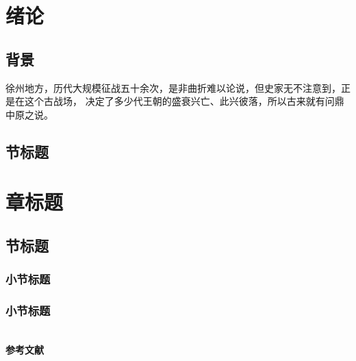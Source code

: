 
\section{绪论}

\subsection{背景}

\par 徐州地方，历代大规模征战五十余次，是非曲折难以论说，但史家无不注意到，正是在这个古战场，
决定了多少代王朝的盛衰兴亡、此兴彼落，所以古来就有问鼎中原之说。

\subsection{节标题}

\section{章标题}

\subsection{节标题}

\subsubsection{小节标题}

\subsubsection{小节标题}

\newpage
{}
\begin{center}
    ~\\[-1.5em]
    \textbf{参考文献}
\end{center}

{\normalfont{}\setlength{\baselineskip}{14pt}
\renewcommand{\refname}{\vspace{-\baselineskip}}
}